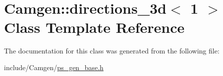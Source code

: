 \hypertarget{a00133}{}\section{Camgen\+:\+:directions\+\_\+3d$<$ 1 $>$ Class Template Reference}
\label{a00133}


The documentation for this class was generated from the following file\+:\begin{DoxyCompactItemize}
\item 
include/\+Camgen/\hyperlink{a00743}{ps\+\_\+gen\+\_\+base.\+h}\end{DoxyCompactItemize}
